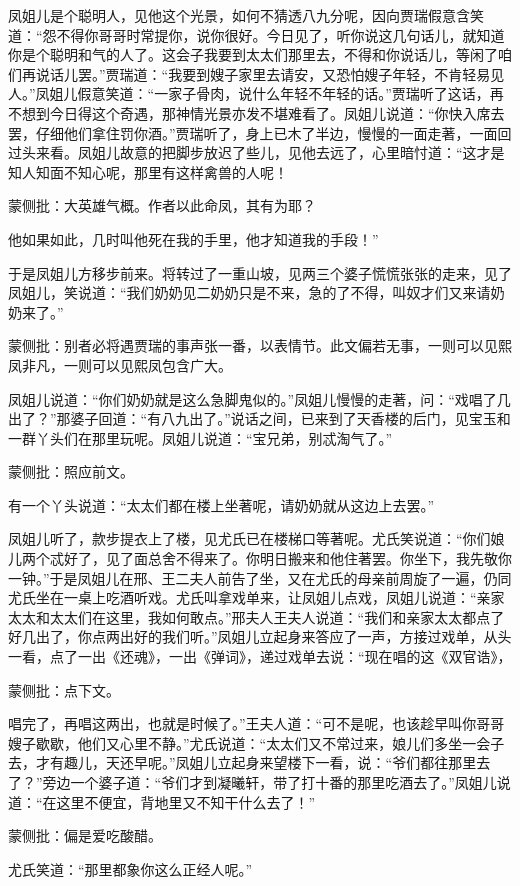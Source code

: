 \begin{parag}


    凤姐儿是个聪明人，见他这个光景，如何不猜透八九分呢，因向贾瑞假意含笑道：“怨不得你哥哥时常提你，说你很好。今日见了，听你说这几句话儿，就知道你是个聪明和气的人了。这会子我要到太太们那里去，不得和你说话儿，等闲了咱们再说话儿罢。”贾瑞道：“我要到嫂子家里去请安，又恐怕嫂子年轻，不肯轻易见人。”凤姐儿假意笑道：“一家子骨肉，说什么年轻不年轻的话。”贾瑞听了这话，再不想到今日得这个奇遇，那神情光景亦发不堪难看了。凤姐儿说道：“你快入席去罢，仔细他们拿住罚你酒。”贾瑞听了，身上已木了半边，慢慢的一面走著，一面回过头来看。凤姐儿故意的把脚步放迟了些儿，见他去远了，心里暗忖道：“这才是知人知面不知心呢，那里有这样禽兽的人呢！\begin{note}蒙侧批：大英雄气概。作者以此命凤，其有为耶？\end{note}他如果如此，几时叫他死在我的手里，他才知道我的手段！”
\end{parag}


\begin{parag}


    于是凤姐儿方移步前来。将转过了一重山坡，见两三个婆子慌慌张张的走来，见了凤姐儿，笑说道：“我们奶奶见二奶奶只是不来，急的了不得，叫奴才们又来请奶奶来了。”\begin{note}蒙侧批：别者必将遇贾瑞的事声张一番，以表情节。此文偏若无事，一则可以见熙凤非凡，一则可以见熙凤包含广大。\end{note}凤姐儿说道：“你们奶奶就是这么急脚鬼似的。”凤姐儿慢慢的走著，问：“戏唱了几出了？”那婆子回道：“有八九出了。”说话之间，已来到了天香楼的后门，见宝玉和一群丫头们在那里玩呢。凤姐儿说道：“宝兄弟，别忒淘气了。”\begin{note}蒙侧批：照应前文。\end{note}有一个丫头说道：“太太们都在楼上坐著呢，请奶奶就从这边上去罢。”
\end{parag}


\begin{parag}


    凤姐儿听了，款步提衣上了楼，见尤氏已在楼梯口等著呢。尤氏笑说道：“你们娘儿两个忒好了，见了面总舍不得来了。你明日搬来和他住著罢。你坐下，我先敬你一钟。”于是凤姐儿在邢、王二夫人前告了坐，又在尤氏的母亲前周旋了一遍，仍同尤氏坐在一桌上吃酒听戏。尤氏叫拿戏单来，让凤姐儿点戏，凤姐儿说道：“亲家太太和太太们在这里，我如何敢点。”邢夫人王夫人说道：“我们和亲家太太都点了好几出了，你点两出好的我们听。”凤姐儿立起身来答应了一声，方接过戏单，从头一看，点了一出《还魂》，一出《弹词》，递过戏单去说：“现在唱的这《双官诰》，\begin{note}蒙侧批：点下文。\end{note}唱完了，再唱这两出，也就是时候了。”王夫人道：“可不是呢，也该趁早叫你哥哥嫂子歇歇，他们又心里不静。”尤氏说道：“太太们又不常过来，娘儿们多坐一会子去，才有趣儿，天还早呢。”凤姐儿立起身来望楼下一看，说：“爷们都往那里去了？”旁边一个婆子道：“爷们才到凝曦轩，带了打十番的那里吃酒去了。”凤姐儿说道：“在这里不便宜，背地里又不知干什么去了！”\begin{note}蒙侧批：偏是爱吃酸醋。\end{note}尤氏笑道：“那里都象你这么正经人呢。”
\end{parag}


